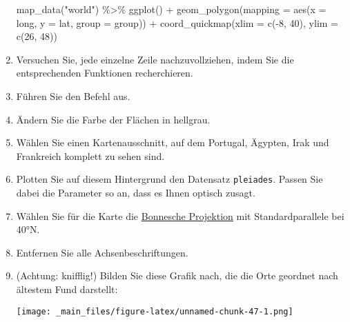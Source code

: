 \documentclass[
  ngerman,
]{article}
\newenvironment{Shaded}{\begin{snugshade}}{\end{snugshade}}
\newcommand{\AttributeTok}[1]{\textcolor[rgb]{0.77,0.63,0.00}{#1}}
\newcommand{\DecValTok}[1]{\textcolor[rgb]{0.00,0.00,0.81}{#1}}
\newcommand{\FunctionTok}[1]{\textcolor[rgb]{0.00,0.00,0.00}{#1}}
\newcommand{\NormalTok}[1]{#1}
\newcommand{\SpecialCharTok}[1]{\textcolor[rgb]{0.00,0.00,0.00}{#1}}
\newcommand{\StringTok}[1]{\textcolor[rgb]{0.31,0.60,0.02}{#1}}
\begin{document}
\begin{enumerate}
\begin{Shaded}
\begin{Highlighting}[]
\FunctionTok{map\_data}\NormalTok{(}\StringTok{"world"}\NormalTok{) }\SpecialCharTok{\%\textgreater{}\%}
  \FunctionTok{ggplot}\NormalTok{() }\SpecialCharTok{+}
    \FunctionTok{geom\_polygon}\NormalTok{(}\AttributeTok{mapping =} \FunctionTok{aes}\NormalTok{(}\AttributeTok{x =}\NormalTok{ long,}
                               \AttributeTok{y =}\NormalTok{ lat,}
                               \AttributeTok{group =}\NormalTok{ group)) }\SpecialCharTok{+}
    \FunctionTok{coord\_quickmap}\NormalTok{(}\AttributeTok{xlim =} \FunctionTok{c}\NormalTok{(}\SpecialCharTok{{-}}\DecValTok{8}\NormalTok{, }\DecValTok{40}\NormalTok{),}
                   \AttributeTok{ylim =} \FunctionTok{c}\NormalTok{(}\DecValTok{26}\NormalTok{, }\DecValTok{48}\NormalTok{))}
\end{Highlighting}
\end{Shaded}
\item
  Versuchen Sie, jede einzelne Zeile nachzuvollziehen, indem Sie die entsprechenden Funktionen recherchieren.
\item
  Führen Sie den Befehl aus.
\item
  Ändern Sie die Farbe der Flächen in hellgrau.
\item
  Wählen Sie einen Kartenausschnitt, auf dem Portugal, Ägypten, Irak und Frankreich komplett zu sehen sind.
\item
  Plotten Sie auf diesem Hintergrund den Datensatz \texttt{pleiades}. Passen Sie dabei die Parameter so an, dass es Ihnen optisch zusagt.
\item
  Wählen Sie für die Karte die \href{https://de.wikipedia.org/wiki/Bonnesche_Projektion}{Bonnesche Projektion} mit Standardparallele bei 40°N.
\item
  Entfernen Sie alle Achsenbeschriftungen.
\item
  (Achtung: knifflig!) Bilden Sie diese Grafik nach, die die Orte geordnet nach ältestem Fund darstellt:

  \texttt{[image: \_main\_files/figure-latex/unnamed-chunk-47-1.png]}
\end{enumerate}
\end{document}
